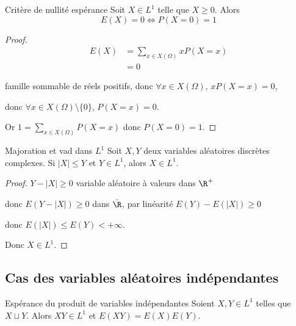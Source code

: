 \begin{proposition}{Critère de nullité espérance}{}
    Soit $X \in L^1$ telle que $X \geqslant 0$. Alors 
    $$ E(X) = 0 \iff P(X = 0) = 1 $$
    
\end{proposition}

\begin{proof}
    \begin{align}
        E(X) & = \sum_{x \in X(\Omega)} x P(X = x) \\
        & = 0
    \end{align}

    famille sommable de réels positifs, donc $\forall x \in X(\Omega), \, x P(X = x) = 0$, 

    donc $\forall x \in X(\Omega) \setminus \{0\}, \, P(X = x) = 0$.

    Or $\displaystyle 1 = \sum_{x \in X(\Omega)} P(X = x)$ donc $P(X = 0) = 1$.
\end{proof}

\begin{proposition}{Majoration et vad dans $L^1$}{}
    Soit $X, Y$ deux variables aléatoires discrètes complexes. Si 
    $|X| \leqslant Y$ et $Y \in L^1$, alors $X \in L^1$.
\end{proposition}


\begin{proof}
    $Y - |X| \geqslant 0$ variable aléatoire à valeurs dans $\R^+$ 
    
    donc $E(Y - |X|) \geqslant 0$ dans $\bar \R$, par linéarité $E(Y) - E(|X|) \geqslant 0$

    donc $E(|X|) \leqslant E(Y) < + \infty$.

    Donc $X \in L^1$.
\end{proof}

\subsection{Cas des variables aléatoires indépendantes }

\begin{theoreme}{Espérance du produit de variables indépendantes}{}
    Soient $X, Y \in L^1$ telles que $X \sqcup Y$. Alors 
    $XY \in L^1$ et $E(XY) = E(X) E(Y)$.
\end{theoreme}


